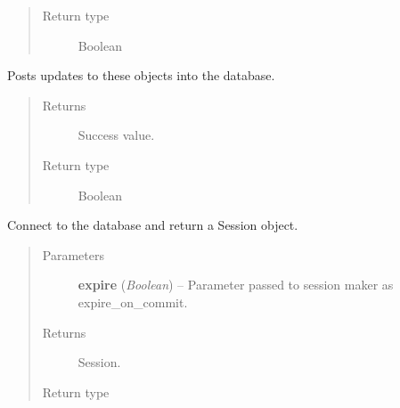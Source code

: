 \documentclass[letterpaper,10pt,english]{sphinxmanual}
\begin{document}
\begin{fulllineitems}
\begin{fulllineitems}
\begin{quote}
\begin{description}
\item[{Return type}] \leavevmode
Boolean

\end{description}\end{quote}

\end{fulllineitems}


\begin{fulllineitems}
\label{modelsbase:modelsbase.MethodMixin.update_many}
Posts updates to these objects into the database.
\begin{quote}\begin{description}
\item[{Returns}] \leavevmode
Success value.

\item[{Return type}] \leavevmode
Boolean

\end{description}\end{quote}

\end{fulllineitems}


\end{fulllineitems}


\begin{fulllineitems}
\label{modelsbase:modelsbase.connect_to_database}
Connect to the database and return a Session object.
\begin{quote}\begin{description}
\item[{Parameters}] \leavevmode
\textbf{expire} (\emph{Boolean}) -- Parameter passed to session maker as expire\_on\_commit.

\item[{Returns}] \leavevmode
Session.

\item[{Return type}] \leavevmode
{}

\end{description}\end{quote}

\end{fulllineitems}
\end{document}
